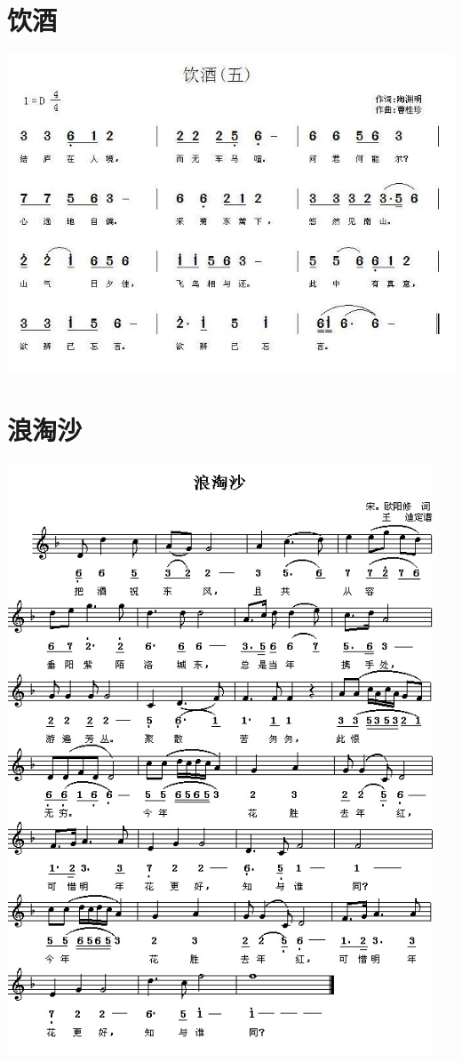 \documentclass[cn,pad,chinesefont=nofont,twocol]{elegantbook}
\begin{document}
\section{饮酒}
    \includegraphics[width=\textwidth]{dongxiao/20200808-饮酒-陶渊明.jpg}
\section{浪淘沙}
    \includegraphics[width=0.95\textwidth]{dongxiao/20200808-浪淘沙-欧阳修.jpg}
\end{document}
